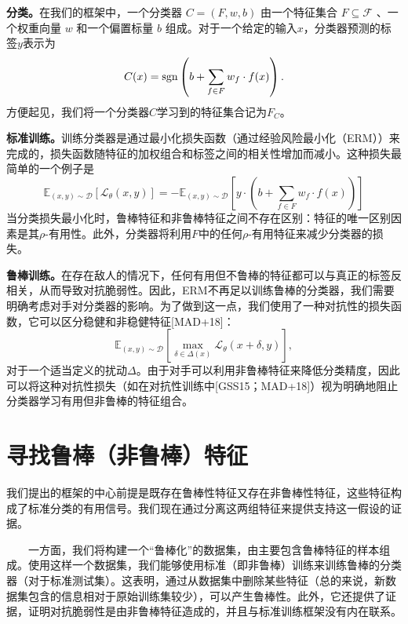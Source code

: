 \documentclass{article}
\begin{document}
\textbf{分类。}在我们的框架中，一个分类器 $C=(F, w, b)$ 由一个特征集合 $F \subseteq \mathcal{F}$ 、一个权重向量 $w$ 和一个偏置标量 $b$ 组成。对于一个给定的输入$x$，分类器预测的标签$y$表示为
\begin{equation*}
  C(x)=\textnormal{sgn}\left(b+\sum_{f \in F} w_{f} \cdot f(x)\right). 
\end{equation*}
方便起见，我们将一个分类器$C$学习到的特征集合记为$F_{C}$。

\textbf{标准训练。}训练分类器是通过最小化损失函数（通过经验风险最小化（ERM））来完成的，损失函数随特征的加权组合和标签之间的相关性增加而减小。这种损失最简单的一个例子是
\begin{equation}
  \mathbb{E}_{(x, y) \sim \mathcal{D}}\left[\mathcal{L}_{\theta}(x, y)\right]=-\mathbb{E}_{(x, y) \sim \mathcal{D}}\left[y \cdot\left(b+\sum_{f \in F} w_{f} \cdot f(x)\right)\right]
\end{equation}
当分类损失最小化时，鲁棒特征和非鲁棒特征之间不存在区别：特征的唯一区别因素是其$\rho$-有用性。此外，分类器将利用$F$中的任何$\rho$-有用特征来减少分类器的损失。

\textbf{鲁棒训练。}在存在敌人的情况下，任何有用但不鲁棒的特征都可以与真正的标签反相关，从而导致对抗脆弱性。因此，ERM不再足以训练鲁棒的分类器，我们需要明确考虑对手对分类器的影响。为了做到这一点，我们使用了一种对抗性的损失函数，它可以区分稳健和非稳健特征[MAD+18]：
\begin{equation}
  \mathbb{E}_{(x, y) \sim \mathcal{D}}\left[\max _{\delta \in \Delta(x)} \mathcal{L}_{\theta}(x+\delta, y)\right],
\end{equation}
对于一个适当定义的扰动$\Delta$。由于对手可以利用非鲁棒特征来降低分类精度，因此可以将这种对抗性损失（如在对抗性训练中[GSS15；MAD+18]）视为明确地阻止分类器学习有用但非鲁棒的特征组合。

\section{寻找鲁棒（非鲁棒）特征}

我们提出的框架的中心前提是既存在鲁棒性特征又存在非鲁棒性特征，这些特征构成了标准分类的有用信号。我们现在通过分离这两组特征来提供支持这一假设的证据。

\ \ \ \ 一方面，我们将构建一个“鲁棒化”的数据集，由主要包含鲁棒特征的样本组成。使用这样一个数据集，我们能够使用标准（即非鲁棒）训练来训练鲁棒的分类器（对于标准测试集）。这表明，通过从数据集中删除某些特征（总的来说，新数据集包含的信息相对于原始训练集较少），可以产生鲁棒性。此外，它还提供了证据，证明对抗脆弱性是由非鲁棒特征造成的，并且与标准训练框架没有内在联系。
\end{document}
